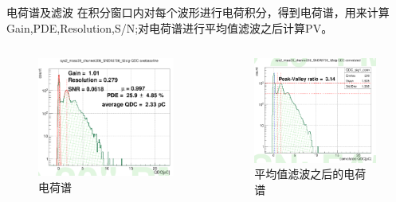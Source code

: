 \documentclass[11pt,compress,xcolor=x11names,UTF8]{beamer}
\begin{document}
\begin{frame}{电荷谱及滤波}
在积分窗口内对每个波形进行电荷积分，得到电荷谱，用来计算Gain,PDE,Resolution,S/N;对电荷谱进行平均值滤波之后计算PV。
\begin{columns}
\begin{column}{.5\textwidth}
\begin{figure}
\centering
\includegraphics[width=\textwidth]{figures/spe.png} %
\caption{电荷谱}
\end{figure}
\end{column}
\begin{column}{.5\textwidth}
\begin{figure}
\centering
\includegraphics[width=\textwidth]{figures/specon.png} %
\caption{平均值滤波之后的电荷谱}
\end{figure}
\end{column}
\end{columns}
\end{frame}
\end{document}
